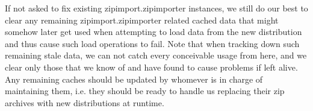 \begin{DoxyVerb}
If not asked to fix existing zipimport.zipimporter instances, we still do
our best to clear any remaining zipimport.zipimporter related cached data
that might somehow later get used when attempting to load data from the new
distribution and thus cause such load operations to fail. Note that when
tracking down such remaining stale data, we can not catch every conceivable
usage from here, and we clear only those that we know of and have found to
cause problems if left alive. Any remaining caches should be updated by
whomever is in charge of maintaining them, i.e. they should be ready to
handle us replacing their zip archives with new distributions at runtime.\end{DoxyVerb}
 
